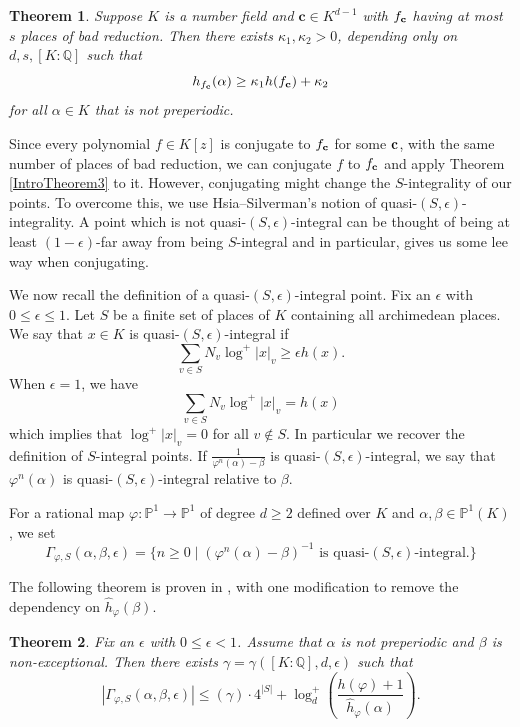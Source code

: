 \documentclass[10pt, reqno]{amsart}
\newcommand{\bb}{\mathbb}
\newcommand{\vphi}{\varphi}
\newcommand{\h}{\widehat{h}}
\newtheorem{theorem}{Theorem}
\numberwithin{theorem}{section}
\numberwithin{equation}{section}
\numberwithin{example}{section}
\numberwithin{definition}{section}
\begin{document}
\begin{theorem} \cite[Theorem 1.2]{Loo19} \label{Looper1}
Suppose $K$ is a number field and $\mathbf{c} \in K^{d-1}$ with $f_{\bf{c}}$ having at most $s$ places of bad reduction. Then there exists $\kappa_1, \kappa_2 > 0$, depending only on $d,s,[K:\bb{Q}]$ such that
$$h_{f_{\bf{c}}}(\alpha) \geq \kappa_1 h(f_{\bf{c}}) + \kappa_2$$
for all $\alpha \in K$ that is not preperiodic. 
\end{theorem}

Since every polynomial $f \in K[z]$ is conjugate to $f_{\bf{c}}$ for some $\bf{c}$, with the same number of places of bad reduction, we can conjugate $f$ to $f_{\bf{c}}$ and apply Theorem \ref{IntroTheorem3} to it. However, conjugating might change the $S$-integrality of our points. To overcome this, we use Hsia--Silverman's notion of quasi-$(S,\epsilon)$-integrality. A point which is not quasi-$(S,\epsilon)$-integral can be thought of being at least $(1-\epsilon)$-far away from being $S$-integral and in particular, gives us some lee way when conjugating. 
\par 
We now recall the definition of a quasi-$(S,\epsilon)$-integral point. Fix an $\epsilon$ with $0 \leq \epsilon \leq 1$. Let $S$ be a finite set of places of $K$ containing all archimedean places. We say that $x \in K$ is quasi-$(S,\epsilon)$-integral if
$$\sum_{v \in S} N_v \log^+|x|_v \geq \epsilon h(x).$$
When $\epsilon = 1$, we have
$$\sum_{v \in S} N_v \log^+|x|_v = h(x)$$
which implies that $\log^+|x|_v = 0$ for all $v \not \in S$. In particular we recover the definition of $S$-integral points. If $\frac{1}{\vphi^n(\alpha)-\beta}$ is quasi-$(S,\epsilon)$-integral, we say that $\vphi^n(\alpha)$ is quasi-$(S,\epsilon)$-integral relative to $\beta$.  
\par 
For a rational map $\vphi: \bb{P}^1 \to \bb{P}^1$ of degree $d \geq 2$ defined over $K$ and $\alpha,\beta \in \bb{P}^1(K)$, we set 
$$\Gamma_{\vphi,S}(\alpha,\beta,\epsilon) = \{ n \geq 0 \mid (\vphi^n(\alpha) - \beta)^{-1} \text{ is quasi-}(S,\epsilon)\text{-integral}.\}$$
\par 
The following theorem is proven in \cite{HS11}, with one modification to remove the dependency on $\h_{\vphi}(\beta)$. 

\begin{theorem} \label{QuasiSIntegral1}
Fix an $\epsilon$ with $0 \leq \epsilon < 1$. Assume that $\alpha$ is not preperiodic and $\beta$ is non-exceptional. Then there exists $\gamma = \gamma([K:\bb{Q}],d,\epsilon)$ such that
$$|\Gamma_{\vphi,S}(\alpha,\beta,\epsilon)| \leq (\gamma) \cdot 4^{|S|} + \log^+_d \left(\frac{h(\vphi)+1}{\h_{\vphi}(\alpha)}\right).$$
\end{theorem}
\end{document}
